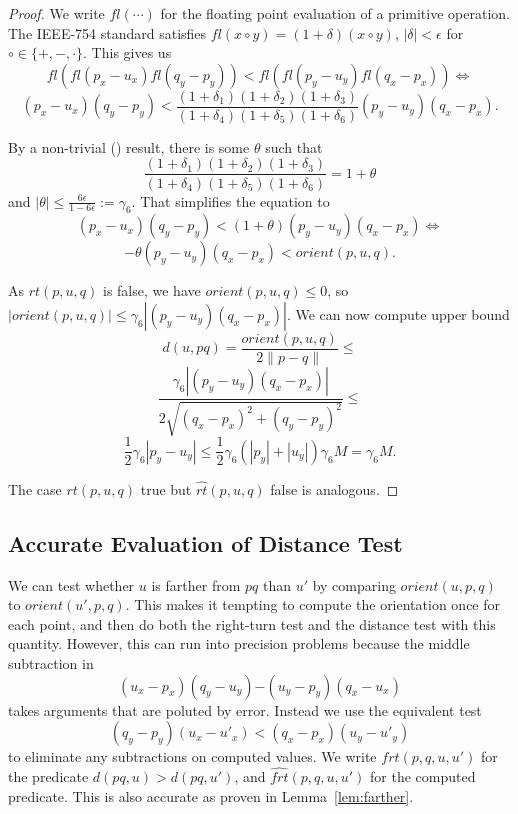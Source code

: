 \begin{proof}
    We write $fl(\cdots)$ for the floating point evaluation of a primitive 
    operation. The IEEE-754 standard satisfies
    $fl(x \circ y) = (1 + \delta)(x \circ y)$, $|\delta| < \epsilon$ for
    $\circ \in \{+, -, \cdot\}$. This gives us
    $$fl(fl(p_x - u_x) fl(q_y - p_y)) < 
            fl(fl(p_y - u_y) fl(q_x - p_x)) \iff$$
    $$(p_x - u_x) (q_y - p_y) < \frac{(1 + \delta_1)(1 + \delta_2)(1 + \delta_3)}
    {(1 + \delta_4)(1 + \delta_5)(1 + \delta_6)} (p_y - u_y) (q_x - p_x).$$

    By a non-trivial () result, there is some $\theta$
    such that
    $$\frac{(1 + \delta_1)(1 + \delta_2)(1 + \delta_3)}{(1 + \delta_4)(1 + \delta_5)(1 + \delta_6)} = 1 + \theta$$
    and $|\theta| \leq \frac{6\epsilon}{1 - 6\epsilon} := \gamma_6$.
    That simplifies the equation to
    $$(p_x - u_x) (q_y - p_y) < (1 + \theta) (p_y - u_y) (q_x - p_x) \iff$$
    $$-\theta (p_y - u_y) (q_x - p_x) < orient(p, u, q).$$

    As $rt(p, u, q)$ is false, we have $orient(p, u, q) \leq 0$, so
    $|orient(p, u, q)| \leq \gamma_6 |(p_y - u_y) (q_x - p_x)|$.
    We can now compute upper bound
    $$d(u, pq) = \frac{orient(p, u, q)}{2 \lVert p - q \rVert} \leq$$
    $$\frac{\gamma_6 |(p_y - u_y) (q_x - p_x)|}{2 \sqrt{(q_x - p_x)^2 + (q_y - p_y)^2}} \leq$$
    $$\frac{1}{2}\gamma_6 |p_y - u_y| \leq 
            \frac{1}{2} \gamma_6 (|p_y| + |u_y|)\gamma_6 M = \gamma_6 M.$$

    The case $rt(p, u, q)$ true but $\hat{rt}(p, u, q)$ false is analogous.
\end{proof}

\subsection{Accurate Evaluation of Distance Test}

We can test whether $u$ is farther from $pq$ than $u'$ by comparing
$orient(u, p, q)$ to $orient(u', p, q)$. This makes it tempting
to compute the orientation once for each point, and then do both
the right-turn test and the distance test with this quantity. However, this
can run into precision problems because the middle subtraction in
$$(u_x - p_x)(q_y - u_y) \bm{-} (u_y - p_y)(q_x - u_x)$$
takes arguments that are poluted by error.
Instead we use the equivalent test
$$(q_y - p_y) (u_x - u'_x) < (q_x - p_x) (u_y - u'_y)$$
to eliminate any subtractions on computed values.
We write $frt(p, q, u, u')$ for the predicate $d(pq, u) > d(pq, u')$,
and $\widehat{frt}(p, q, u, u')$ for the computed predicate. This is also
accurate as proven in Lemma~\ref{lem:farther}.

